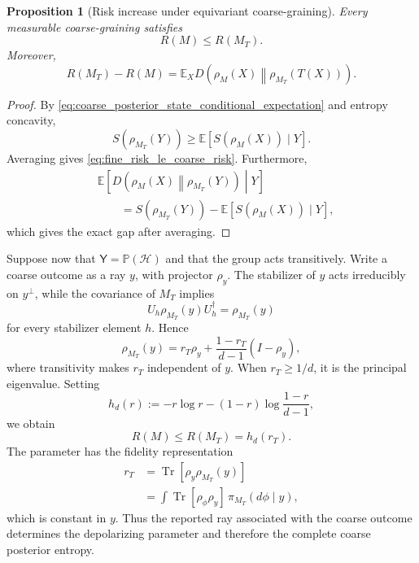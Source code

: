 \documentclass[journal]{IEEEtran}
\newtheorem{proposition}[theorem]{Proposition}
\begin{document}
\begin{proposition}[Risk increase under equivariant coarse-graining]
\label{prop:risk_increase_under_orbit_coarse_graining}
Every measurable coarse-graining satisfies
\begin{equation}
    R(M)\le R(M_T).
    \label{eq:fine_risk_le_coarse_risk}
\end{equation}
Moreover,
\begin{equation}
    R(M_T)-R(M)
    =
    \mathbb E_X
    D\!\left(
       \rho_M(X)\middle\|\rho_{M_T}(T(X))
    \right).
    \label{eq:coarse_graining_entropy_gap_relative_entropy}
\end{equation}
\end{proposition}

\begin{proof}
By \eqref{eq:coarse_posterior_state_conditional_expectation} and entropy
concavity,
\[
 S(\rho_{M_T}(Y))
 \ge {\mathbb E}[S(\rho_M(X))\mid Y].
\]
Averaging gives \eqref{eq:fine_risk_le_coarse_risk}.  Furthermore,
\[
\begin{aligned}
&{\mathbb E}\!\left[
 D\!\left(\rho_M(X)\middle\|\rho_{M_T}(Y)\right)\middle|Y
\right]\\
&\qquad=
S(\rho_{M_T}(Y))-{\mathbb E}[S(\rho_M(X))\mid Y],
\end{aligned}
\]
which gives the exact gap after averaging.
\end{proof}

Suppose now that \(\mathsf Y=\mathbb P(\mathcal H)\) and that the group acts
transitively.  Write a coarse outcome as a ray \(y\), with projector
\(\rho_y\).  The stabilizer of \(y\) acts irreducibly on \(y^\perp\), while the
covariance of \(M_T\) implies
\[
    U_h\rho_{M_T}(y)U_h^\dagger=\rho_{M_T}(y)
\]
for every stabilizer element \(h\).  Hence
\begin{equation}
    \rho_{M_T}(y)
    =
    r_T\rho_y+
    \frac{1-r_T}{d-1}(I-\rho_y),
    \label{eq:coarse_posterior_depolarizing_form}
\end{equation}
where transitivity makes \(r_T\) independent of \(y\).  When
\(r_T\ge 1/d\), it is the principal eigenvalue.  Setting
\begin{equation}
    h_d(r)
    :=
    -r\log r-(1-r)\log\frac{1-r}{d-1},
    \label{eq:h_d_lambda_definition}
\end{equation}
we obtain
\begin{equation}
    R(M)\le R(M_T)=h_d(r_T).
    \label{eq:fine_risk_upper_bounded_by_coarse_lambda_entropy}
\end{equation}
The parameter has the fidelity representation
\begin{equation}
\begin{split}
    r_T
    &=
    \operatorname{Tr}[\rho_y\rho_{M_T}(y)]                                    \\
    &=
    \int
    \operatorname{Tr}[\rho_\phi\rho_y] \,\pi_{M_T}(d\phi\mid y),
\end{split}
\label{eq:coarse_lambda_output_fidelity}
\end{equation}
which is constant in \(y\).  Thus the reported ray associated with the coarse
outcome determines the depolarizing parameter and therefore the complete
coarse posterior entropy.
\end{document}
